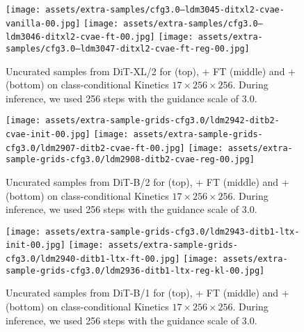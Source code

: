 \begin{figure*}[h]
\centering
\texttt{[image: assets/extra-samples/cfg3.0--ldm3045-ditxl2-cvae-vanilla-00.jpg]}
\texttt{[image: assets/extra-samples/cfg3.0--ldm3046-ditxl2-cvae-ft-00.jpg]}
\texttt{[image: assets/extra-samples/cfg3.0--ldm3047-ditxl2-cvae-ft-reg-00.jpg]}
\caption{Uncurated samples from DiT-XL/2 for \cvaefull (top), \cvaefull + FT (middle) and \cvaefull + \regshortname (bottom) on class-conditional Kinetics $17 \times 256 \times 256$. During inference, we used 256 steps with the guidance scale of 3.0.}
\label{fig:ap:extra-samples-ditxl-cvae}
\end{figure*}

\begin{figure*}[h]
\centering
\texttt{[image: assets/extra-sample-grids-cfg3.0/ldm2942-ditb2-cvae-init-00.jpg]}
\texttt{[image: assets/extra-sample-grids-cfg3.0/ldm2907-ditb2-cvae-ft-00.jpg]}
\texttt{[image: assets/extra-sample-grids-cfg3.0/ldm2908-ditb2-cvae-reg-00.jpg]}
\caption{Uncurated samples from DiT-B/2 for \cvaefull (top), \cvaefull + FT (middle) and \cvaefull + \regshortname (bottom) on class-conditional Kinetics $17 \times 256 \times 256$. During inference, we used 256 steps with the guidance scale of 3.0.}
\label{fig:ap:extra-samples-ditb-cvae}
\end{figure*}


\begin{figure*}[h]
\centering
\texttt{[image: assets/extra-sample-grids-cfg3.0/ldm2943-ditb1-ltx-init-00.jpg]}
\texttt{[image: assets/extra-sample-grids-cfg3.0/ldm2940-ditb1-ltx-ft-00.jpg]}
\texttt{[image: assets/extra-sample-grids-cfg3.0/ldm2936-ditb1-ltx-reg-kl-00.jpg]}
\caption{Uncurated samples from DiT-B/1 for \ltxae (top), \ltxae + FT (middle) and \ltxae + \regshortname (bottom) on class-conditional Kinetics $17 \times 256 \times 256$. During inference, we used 256 steps with the guidance scale of 3.0.}
\label{fig:ap:extra-samples-ditb-ltxae}
\end{figure*}
